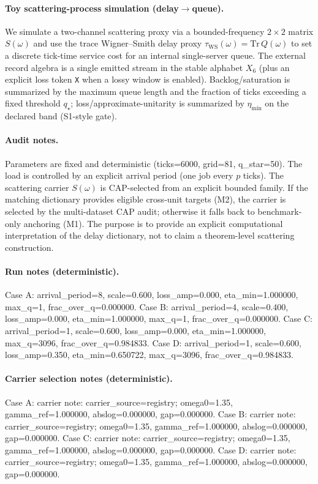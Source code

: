 \paragraph{Toy scattering-process simulation (delay$\rightarrow$queue).} \AuditTag We simulate a two-channel scattering proxy via a bounded-frequency $2\times 2$ matrix $S(\omega)$ and use the trace Wigner--Smith delay proxy $\tau_{\mathrm{WS}}(\omega)=\mathrm{Tr}\,Q(\omega)$ to set a discrete tick-time service cost for an internal single-server queue. The external record algebra is a single emitted stream in the stable alphabet $X_6$ (plus an explicit loss token \texttt{X} when a lossy window is enabled). Backlog/saturation is summarized by the maximum queue length and the fraction of ticks exceeding a fixed threshold $q_\star$; loss/approximate-unitarity is summarized by $\eta_{\min}$ on the declared band (S1-style gate).
\paragraph{Audit notes.} \AuditTag Parameters are fixed and deterministic (ticks=6000, grid=81, q\_star=50). The load is controlled by an explicit arrival period (one job every $p$ ticks). The scattering carrier $S(\omega)$ is CAP-selected from an explicit bounded family. If the matching dictionary provides eligible cross-unit targets (M2), the carrier is selected by the multi-dataset CAP audit; otherwise it falls back to benchmark-only anchoring (M1). The purpose is to provide an explicit computational interpretation of the delay dictionary, not to claim a theorem-level scattering construction.
\paragraph{Run notes (deterministic).} \AuditTag Case A: arrival_period=8, scale=0.600, loss_amp=0.000, eta_min=1.000000, max_q=1, frac_over_q=0.000000. Case B: arrival_period=4, scale=0.400, loss_amp=0.000, eta_min=1.000000, max_q=1, frac_over_q=0.000000. Case C: arrival_period=1, scale=0.600, loss_amp=0.000, eta_min=1.000000, max_q=3096, frac_over_q=0.984833. Case D: arrival_period=1, scale=0.600, loss_amp=0.350, eta_min=0.650722, max_q=3096, frac_over_q=0.984833.
\paragraph{Carrier selection notes (deterministic).} \AuditTag Case A: carrier note: carrier_source=registry; omega0=1.35, gamma_ref=1.000000, abslog=0.000000, gap=0.000000. Case B: carrier note: carrier_source=registry; omega0=1.35, gamma_ref=1.000000, abslog=0.000000, gap=0.000000. Case C: carrier note: carrier_source=registry; omega0=1.35, gamma_ref=1.000000, abslog=0.000000, gap=0.000000. Case D: carrier note: carrier_source=registry; omega0=1.35, gamma_ref=1.000000, abslog=0.000000, gap=0.000000.